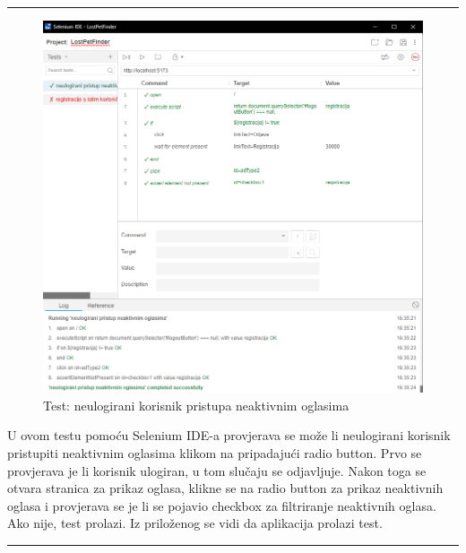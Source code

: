 			\par\noindent\rule{\textwidth}{0.5pt}
			
			\begin{figure}[!htb]
				\centering
				\includegraphics[width=\textwidth]{slike/selenium_test_1.png}
				\caption{Test: neulogirani korisnik pristupa neaktivnim oglasima}
			\end{figure}
			
			U ovom testu pomoću Selenium IDE-a provjerava se može li neulogirani korisnik pristupiti neaktivnim oglasima klikom na pripadajući radio button. Prvo se provjerava je li korisnik ulogiran, u tom slučaju se odjavljuje. Nakon toga se otvara stranica za prikaz oglasa, klikne se na radio button za prikaz neaktivnih oglasa i provjerava se je li se pojavio checkbox za filtriranje neaktivnih oglasa. Ako nije, test prolazi. Iz priloženog se vidi da aplikacija prolazi test.  
			
			\par\noindent\rule{\textwidth}{0.5pt}
			
